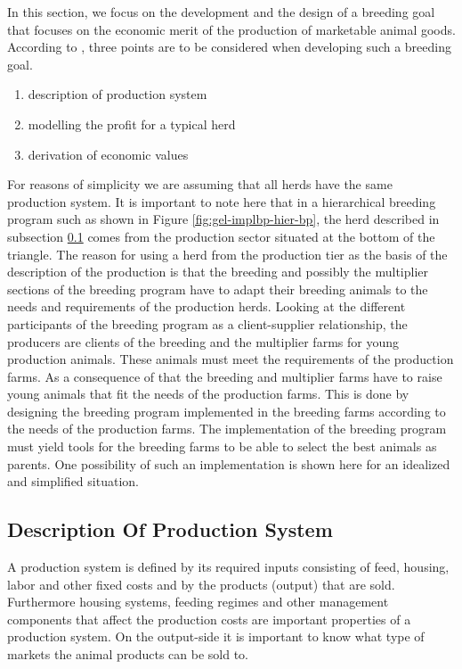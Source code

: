 \documentclass[
]{book}
\providecommand{\tightlist}{%
  \setlength{\itemsep}{0pt}\setlength{\parskip}{0pt}}
\begin{document}
In this section, we focus on the development and the design of a breeding goal that focuses on the economic merit of the production of marketable animal goods. According to \citep{Phocas1998}, three points are to be considered when developing such a breeding goal.

\begin{enumerate}
\def\labelenumi{\arabic{enumi}.}
\tightlist
\item
  description of production system
\item
  modelling the profit for a typical herd
\item
  derivation of economic values
\end{enumerate}

For reasons of simplicity we are assuming that all herds have the same production system. It is important to note here that in a hierarchical breeding program such as shown in Figure \ref{fig:gel-implbp-hier-bp}, the herd described in subsection \ref{gel-implbp-descprodsys} comes from the production sector situated at the bottom of the triangle. The reason for using a herd from the production tier as the basis of the description of the production is that the breeding and possibly the multiplier sections of the breeding program have to adapt their breeding animals to the needs and requirements of the production herds. Looking at the different participants of the breeding program as a client-supplier relationship, the producers are clients of the breeding and the multiplier farms for young production animals. These animals must meet the requirements of the production farms. As a consequence of that the breeding and multiplier farms have to raise young animals that fit the needs of the production farms. This is done by designing the breeding program implemented in the breeding farms according to the needs of the production farms. The implementation of the breeding program must yield tools for the breeding farms to be able to select the best animals as parents. One possibility of such an implementation is shown here for an idealized and simplified situation.

\hypertarget{gel-implbp-descprodsys}{%
\subsection{Description Of Production System}\label{gel-implbp-descprodsys}}

A production system is defined by its required inputs consisting of feed, housing, labor and other fixed costs and by the products (output) that are sold. Furthermore housing systems, feeding regimes and other management components that affect the production costs are important properties of a production system. On the output-side it is important to know what type of markets the animal products can be sold to.
\end{document}
